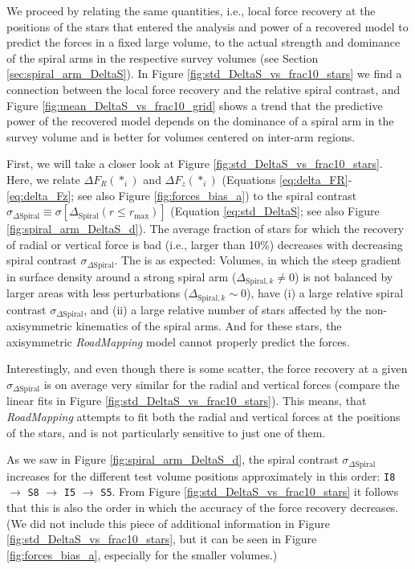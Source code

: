 \documentclass[iop,revtex4,numberedappendix,appendixfloats]{emulateapj}
\newcommand{\RM}{{\sl RoadMapping}}
\begin{document}
We proceed by relating the same quantities, i.e., local force recovery at the positions of the stars that entered the analysis and power of a recovered model to predict the forces in a fixed large volume, to the actual strength and dominance of the spiral arms in the respective survey volumes (see Section \ref{sec:spiral_arm_DeltaS}). In Figure \ref{fig:std_DeltaS_vs_frac10_stars} we find a connection between the local force recovery and the relative spiral contrast, and Figure \ref{fig:mean_DeltaS_vs_frac10_grid} shows a trend that the predictive power of the recovered model depends on the dominance of a spiral arm in the survey volume and is better for volumes centered on inter-arm regions.

First, we will take a closer look at Figure \ref{fig:std_DeltaS_vs_frac10_stars}. Here, we relate $\Delta F_R(*_i)$ and $\Delta F_z(*_i)$ (Equations \eqref{eq:delta_FR}-\eqref{eq:delta_Fz}; see also Figure \ref{fig:forces_bias_a}) to the spiral contrast $\sigma_{\Delta\text{Spiral}} \equiv \sigma[\Delta_\text{Spiral}(r \leq r_\text{max})]$ (Equation \eqref{eq:std_DeltaS}; see also Figure \ref{fig:spiral_arm_DeltaS_d}). The average fraction of stars for which the recovery of radial or vertical force is bad (i.e., larger than 10\%) decreases with decreasing spiral contrast $\sigma_{\Delta\text{Spiral}}$. The is as expected: Volumes, in which the steep gradient in surface density around a strong spiral arm ($\Delta_{\text{Spiral},k} \neq 0$) is not balanced by larger areas with less perturbations ($\Delta_{\text{Spiral},k} \sim 0$), have (i) a large relative spiral contrast $\sigma_{\Delta\text{Spiral}}$, and (ii) a large relative number of stars affected by the non-axisymmetric kinematics of the spiral arms. And for these stars, the axisymmetric \RM{} model cannot properly predict the forces.

Interestingly, and even though there is some scatter, the force recovery at a given $\sigma_{\Delta\text{Spiral}}$ is on average very similar for the radial and vertical forces (compare the linear fits in Figure \ref{fig:std_DeltaS_vs_frac10_stars}). This means, that \RM{} attempts to fit both the radial and vertical forces at the positions of the stars, and is not particularly sensitive to just one of them.

As we saw in Figure \ref{fig:spiral_arm_DeltaS_d}, the spiral contrast $\sigma_{\Delta \text{Spiral}}$ increases for the different test volume positions approximately in this order: \texttt{I8} $\longrightarrow$ \texttt{S8} $\longrightarrow$ \texttt{I5} $\longrightarrow$ \texttt{S5}. From Figure \ref{fig:std_DeltaS_vs_frac10_stars} it follows that this is also the order in which the accuracy of the force recovery decreases. (We did not include this piece of additional information in Figure \ref{fig:std_DeltaS_vs_frac10_stars}, but it can be seen in Figure \ref{fig:forces_bias_a}, especially for the smaller volumes.)
\end{document}
